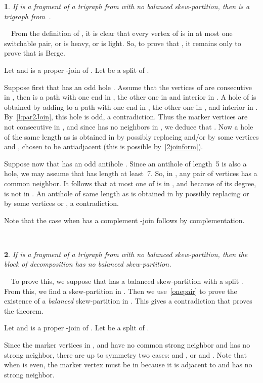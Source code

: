 \documentclass[11 pt] {article}
\newcommand\blackslug{\hbox{\hskip 1pt \vrule width 4pt height 8pt depth 1.5pt
        \hskip 1pt}}
\newcommand\bbox{\hfill \quad \blackslug \medbreak}
\newtheorem{theorem}{}[section]
\newcounter{claim}
\newcommand{\Proof}{\setcounter{claim}{0}\noindent{\bf Proof.}\ \ }
\begin{document}
\begin{theorem}
 \label{l:stayBerge}
 If  is a fragment of a trigraph  from  with no
 balanced skew-partition, then  is a trigraph from~.
\end{theorem}

\Proof From the definition of , it is clear that every vertex of
 is in at most one switchable pair, or is heavy, or is light.
So, to prove that , it remains only to prove
that  is Berge.

Let  and  is a proper -join of . Let
 be a split of . 

Suppose first that  has an odd hole .
Assume that the vertices of  are consecutive in ,
then  is a path  with one end in , the
other one in  and interior in . A hole of  is obtained
by adding to  a path with one end in , the other one in ,
and interior in . By~\ref{l:par2Join}, this hole is odd, a
contradiction. Thus the marker vertices are not consecutive in ,
and since  has no neighbors in , we deduce
that . Now a hole of the same length as  is obtained in
 by possibly replacing  and/or  by some vertices  and , chosen to be antiadjacent (this is possible
by~\ref{2joinform}).

Suppose now that  has an odd antihole . Since an antihole of length~5 is also a hole, we may assume that
 has length at least~7. So, in , any pair of vertices has a
common neighbor. It follows that at most one of  is in ,
and because of its degree,  is not in . 
An antihole of same length as  is obtained in
 by possibly replacing  or  by some vertices  or , a contradiction. 

Note that the case when  has a complement -join follows by complementation.

\bbox


\begin{theorem}\label{stab}
  If  is a fragment of a trigraph  from  with no
  balanced skew-partition, then the block of decomposition  has
  no balanced skew-partition.
\end{theorem}

\Proof To prove this, we suppose that  has a balanced skew-partition  with a split .  From this,
we find a skew-partition in .  Then we use~\ref{onepair} to prove
the existence of a \emph{balanced} skew-partition in .  This gives
a contradiction that proves the theorem.

Let  and  is a proper -join of
. Let  be a split of .

Since the marker vertices in ,  and  have no common strong
neighbor and  has no strong neighbor, there are up to symmetry two
cases:  and , or  and . Note that when  is even, the marker vertex  must
be in  because it is adjacent to  and has no strong neighbor.
\end{document}
